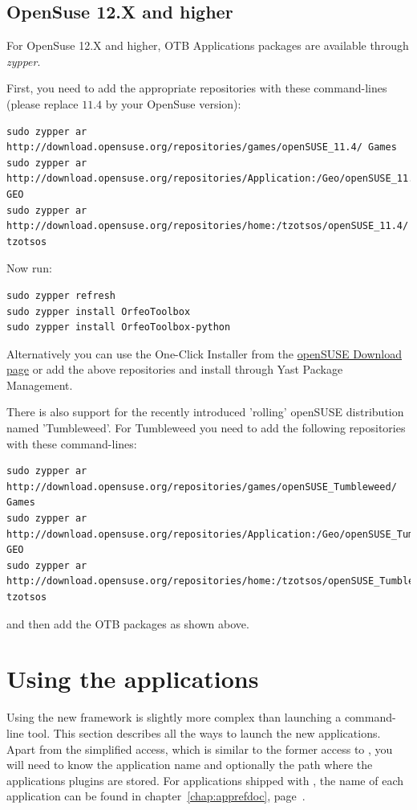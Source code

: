 \subsection{OpenSuse 12.X and higher}

For OpenSuse 12.X and higher, OTB Applications packages are available through
\emph{zypper}.

First, you need to add the appropriate repositories with these command-lines (please replace $11.4$ by your OpenSuse version):
\begin{verbatim}
sudo zypper ar
http://download.opensuse.org/repositories/games/openSUSE_11.4/ Games
sudo zypper ar
http://download.opensuse.org/repositories/Application:/Geo/openSUSE_11.4/ GEO
sudo zypper ar
http://download.opensuse.org/repositories/home:/tzotsos/openSUSE_11.4/ tzotsos
\end{verbatim}

Now run:
\begin{verbatim}
sudo zypper refresh
sudo zypper install OrfeoToolbox
sudo zypper install OrfeoToolbox-python
\end{verbatim}

Alternatively you can use the One-Click Installer from the \href{http://software.opensuse.org/search?q=Orfeo&baseproject=openSUSE\%3A11.4&lang=en&include_home=true&exclude_debug=true}{openSUSE Download page} or add the above repositories and install through Yast Package Management.

There is also support for the recently introduced 'rolling' openSUSE distribution named 'Tumbleweed'.
For Tumbleweed you need to add the following repositories with these command-lines:
\begin{verbatim}
sudo zypper ar
http://download.opensuse.org/repositories/games/openSUSE_Tumbleweed/ Games
sudo zypper ar
http://download.opensuse.org/repositories/Application:/Geo/openSUSE_Tumbleweed/ GEO
sudo zypper ar
http://download.opensuse.org/repositories/home:/tzotsos/openSUSE_Tumbleweed/ tzotsos
\end{verbatim}
and then add the OTB packages as shown above.

\section{Using the applications}\label{sec:usingapps}

Using the new \app framework is slightly more complex than launching a
command-line tool. This section describes all the ways to launch the
new applications. Apart from the simplified access, which is similar
to the former access to \app, you will need to know the application 
name and optionally the path where the applications plugins are stored.
For applications shipped with \otb, the name of each 
application can be found in chapter~\ref{chap:apprefdoc}, 
page~\pageref{chap:apprefdoc}.

